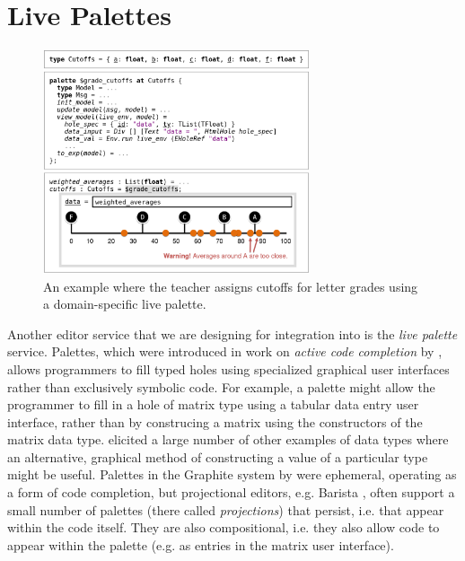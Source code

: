 
\section{Live Palettes}
\label{sec:palettes}


\begin{figure}[t]
\includegraphics[width=0.7\textwidth]{images/cutoffs-new.png}
\caption{An example where the teacher assigns cutoffs 
for letter grades using a domain-specific live palette.}
\label{fig:cutoffs-example}
\end{figure}

Another editor service that we are designing for integration into \Hazel 
is the \emph{live palette} service. 
Palettes, which were introduced in work on
\emph{active code completion} by \citet{ActiveCodeCompletion},  allows programmers to fill typed 
holes using specialized graphical user interfaces rather than exclusively symbolic
code. For example, a palette might allow the programmer to 
fill in a hole of matrix type using a tabular data entry 
user interface, rather than by construcing a matrix 
using the constructors of the matrix data type. \citet{ActiveCodeCompletion} elicited a large number of other
examples of data types where an alternative, graphical 
method of constructing a value of a particular type might be
useful.
Palettes in the Graphite system by \citet{ActiveCodeCompletion} 
were ephemeral, operating as a form of code completion, but projectional editors, e.g. Barista \cite{ko_barista:_2006}, often support a small number of  
palettes (there called \emph{projections}) that persist, i.e. that appear within the code itself.
They are also compositional, i.e. they also allow code to appear within the palette (e.g. as entries in the matrix user interface). 

